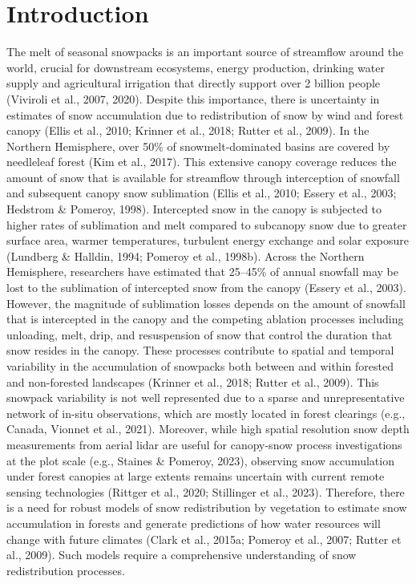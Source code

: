\documentclass[
  letterpaper,
]{tex/uofsthesis-cs}
\begin{document}
\section{Introduction}\label{introduction-1}

The melt of seasonal snowpacks is an important source of streamflow
around the world, crucial for downstream ecosystems, energy production,
drinking water supply and agricultural irrigation that directly support
over 2 billion people (Viviroli et al., 2007, 2020). Despite this
importance, there is uncertainty in estimates of snow accumulation due
to redistribution of snow by wind and forest canopy (Ellis et al., 2010;
Krinner et al., 2018; Rutter et al., 2009). In the Northern Hemisphere,
over 50\% of snowmelt-dominated basins are covered by needleleaf forest
(Kim et al., 2017). This extensive canopy coverage reduces the amount of
snow that is available for streamflow through interception of snowfall
and subsequent canopy snow sublimation (Ellis et al., 2010; Essery et
al., 2003; Hedstrom \& Pomeroy, 1998). Intercepted snow in the canopy is
subjected to higher rates of sublimation and melt compared to subcanopy
snow due to greater surface area, warmer temperatures, turbulent energy
exchange and solar exposure (Lundberg \& Halldin, 1994; Pomeroy et al.,
1998b). Across the Northern Hemisphere, researchers have estimated that
25--45\% of annual snowfall may be lost to the sublimation of
intercepted snow from the canopy (Essery et al., 2003). However, the
magnitude of sublimation losses depends on the amount of snowfall that
is intercepted in the canopy and the competing ablation processes
including unloading, melt, drip, and resuspension of snow that control
the duration that snow resides in the canopy. These processes contribute
to spatial and temporal variability in the accumulation of snowpacks
both between and within forested and non-forested landscapes (Krinner et
al., 2018; Rutter et al., 2009). This snowpack variability is not well
represented due to a sparse and unrepresentative network of in-situ
observations, which are mostly located in forest clearings (e.g.,
Canada, Vionnet et al., 2021). Moreover, while high spatial resolution
snow depth measurements from aerial lidar are useful for canopy-snow
process investigations at the plot scale (e.g., Staines \& Pomeroy,
2023), observing snow accumulation under forest canopies at large
extents remains uncertain with current remote sensing technologies
(Rittger et al., 2020; Stillinger et al., 2023). Therefore, there is a
need for robust models of snow redistribution by vegetation to estimate
snow accumulation in forests and generate predictions of how water
resources will change with future climates (Clark et al., 2015a; Pomeroy
et al., 2007; Rutter et al., 2009). Such models require a comprehensive
understanding of snow redistribution processes.
\end{document}
